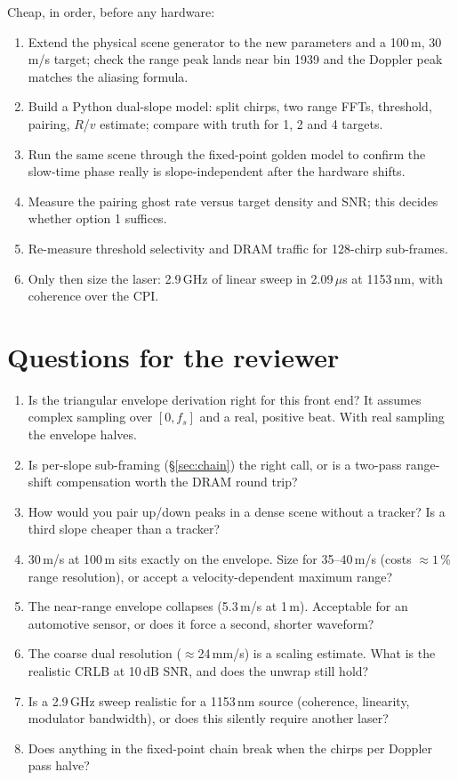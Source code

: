 \documentclass[11pt,a4paper]{article}
\newcommand{\fs}{f_s}
\begin{document}
Cheap, in order, before any hardware:
\begin{enumerate}[label=\arabic*.]
\item Extend the physical scene generator to the new parameters and a 100\,m,
30\,m/s target; check the range peak lands near bin 1939 and the Doppler peak
matches the aliasing formula.
\item Build a Python dual-slope model: split chirps, two range FFTs, threshold,
pairing, $R$/$v$ estimate; compare with truth for 1, 2 and 4 targets.
\item Run the same scene through the fixed-point golden model to confirm the
slow-time phase really is slope-independent after the hardware shifts.
\item Measure the pairing ghost rate versus target density and SNR; this
decides whether option 1 suffices.
\item Re-measure threshold selectivity and DRAM traffic for 128-chirp
sub-frames.
\item Only then size the laser: 2.9\,GHz of linear sweep in 2.09\,$\mu$s at
1153\,nm, with coherence over the CPI.
\end{enumerate}

\section{Questions for the reviewer}

\begin{enumerate}[label=\textbf{Q\arabic*.}]
\item Is the triangular envelope derivation right for this front end? It
assumes complex sampling over $[0,\fs]$ and a real, positive beat. With real
sampling the envelope halves.
\item Is per-slope sub-framing (\S\ref{sec:chain}) the right call, or is a
two-pass range-shift compensation worth the DRAM round trip?
\item How would you pair up/down peaks in a dense scene without a tracker? Is a
third slope cheaper than a tracker?
\item 30\,m/s at 100\,m sits exactly on the envelope. Size for 35--40\,m/s
(costs $\approx1$\,\% range resolution), or accept a velocity-dependent maximum
range?
\item The near-range envelope collapses (5.3\,m/s at 1\,m). Acceptable for an
automotive sensor, or does it force a second, shorter waveform?
\item The coarse dual resolution ($\approx$24\,mm/s) is a scaling estimate.
What is the realistic CRLB at 10\,dB SNR, and does the unwrap still hold?
\item Is a 2.9\,GHz sweep realistic for a 1153\,nm source (coherence,
linearity, modulator bandwidth), or does this silently require another laser?
\item Does anything in the fixed-point chain break when the chirps per Doppler
pass halve?
\end{enumerate}
\end{document}
